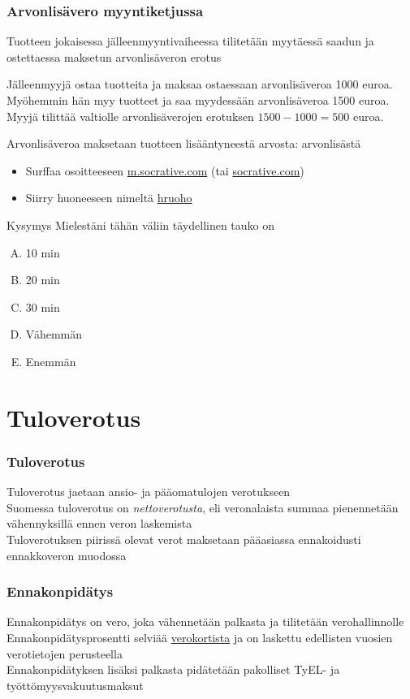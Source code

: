 \documentclass{beamer}
\newcommand{\pblock}{\\ \vspace{0.5cm}\pause}
\newcommand{\socrativeOhje}{
\begin{itemize}
\item Surffaa osoitteeseen \url{m.socrative.com} (tai \url{socrative.com})
\item Siirry huoneeseen nimeltä \url{hruoho}
\end{itemize}
}
\newcommand{\taukoKysymys}{
\socrativeOhje
	\begin{block}{Kysymys}
	Mielestäni tähän väliin täydellinen tauko on
	\begin{enumerate}[(A)]
		\item 10 min
		\item 20 min
		\item 30 min
		\item Vähemmän 
		\item Enemmän
	\end{enumerate}	
	\end{block}
}
\begin{document}
\begin{frame}
\frametitle{Arvonlisävero myyntiketjussa}

Tuotteen jokaisessa jälleenmyyntivaiheessa tilitetään myytäessä saadun ja  ostettaessa maksetun arvonlisäveron erotus\pause
\begin{esim}
Jälleenmyyjä ostaa tuotteita ja maksaa ostaessaan arvonlisäveroa 1000 euroa.
\pause Myöhemmin hän myy tuotteet ja saa myydessään arvonlisäveroa 1500 euroa.
\pause Myyjä tilittää valtiolle arvonlisäverojen erotuksen \(1500-1000=500\) euroa.
\end{esim}\pause
Arvonlisäveroa maksetaan tuotteen lisääntyneestä arvosta: arvonlisästä
\end{frame}

\begin{frame}
\taukoKysymys
\end{frame}

\section{Tuloverotus}

\begin{frame}
\frametitle{Tuloverotus}
\pause
Tuloverotus jaetaan ansio- ja pääomatulojen verotukseen
\pblock
Suomessa tuloverotus on \emph{nettoverotusta}, eli veronalaista summaa pienennetään vähennyksillä ennen veron laskemista 
\pblock
Tuloverotuksen piirissä olevat verot maksetaan pääasiassa ennakoidusti ennakkoveron muodossa
\end{frame}

\begin{frame}
\frametitle{Ennakonpidätys}
\pause
Ennakonpidätys on vero, joka vähennetään palkasta ja tilitetään verohallinnolle
\pblock
Ennakonpidätysprosentti selviää \href{http://portal.vero.fi/Demo_VKV2015/Sivut/Login.aspx?demoasiakas=d1b73ac40dc9436a86f4b0683cd30d24&culture=fi-FI}{verokortista} ja on laskettu edellisten vuosien verotietojen perusteella
\pblock
Ennakonpidätyksen lisäksi palkasta pidätetään pakolliset TyEL- ja työttömyysvakuutusmaksut
\end{frame}
\end{document}
